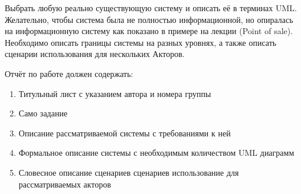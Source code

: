 Выбрать любую реально существующую систему и 
описать её в терминах UML. Желательно, чтобы 
система была не полностью информационной, но 
опиралась на информационную систему как 
показано в примере на лекции (Point of sale). 
Необходимо описать границы системы на разных 
уровнях, а также описать сценарии использования 
для нескольких Акторов.


Отчёт по работе должен содержать:
\begin{enumerate}
  \item Титульный лист с указанием автора и номера группы
  \item Само задание
  \item Описание рассматриваемой системы с требованиями к ней
  \item Формальное описание системы с необходимым количеством UML диаграмм
  \item Словесное описание сценариев сценариев использование для рассматриваемых акторов
\end{enumerate}
